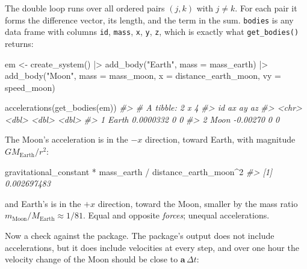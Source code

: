 \documentclass[
  10.5pt,
  letterpaper,
]{scrbook}
\newenvironment{Shaded}{\begin{snugshade}}{\end{snugshade}}
\newcommand{\AttributeTok}[1]{\textcolor[rgb]{0.00,0.00,0.00}{#1}}
\newcommand{\CommentTok}[1]{\textcolor[rgb]{0.00,0.00,0.00}{\textit{#1}}}
\newcommand{\DecValTok}[1]{\textcolor[rgb]{0.00,0.00,0.00}{#1}}
\newcommand{\FunctionTok}[1]{\textcolor[rgb]{0.00,0.00,0.00}{#1}}
\newcommand{\NormalTok}[1]{\textcolor[rgb]{0.00,0.00,0.00}{#1}}
\newcommand{\OtherTok}[1]{\textcolor[rgb]{0.00,0.00,0.00}{#1}}
\newcommand{\SpecialCharTok}[1]{\textcolor[rgb]{0.00,0.00,0.00}{#1}}
\newcommand{\StringTok}[1]{\textcolor[rgb]{0.00,0.00,0.00}{#1}}
\theoremstyle{plain}
\theoremstyle{remark}
\begin{document}
The double loop runs over all ordered pairs \((j, k)\) with
\(j \neq k\). For each pair it forms the difference vector, its length,
and the term in the sum. \texttt{bodies} is any data frame with columns
\texttt{id}, \texttt{mass}, \texttt{x}, \texttt{y}, \texttt{z}, which is
exactly what \texttt{get\_bodies()} returns:

\begin{Shaded}
\begin{Highlighting}[]
\NormalTok{em }\OtherTok{\textless{}{-}} \FunctionTok{create\_system}\NormalTok{() }\SpecialCharTok{|\textgreater{}}
  \FunctionTok{add\_body}\NormalTok{(}\StringTok{"Earth"}\NormalTok{, }\AttributeTok{mass =}\NormalTok{ mass\_earth) }\SpecialCharTok{|\textgreater{}}
  \FunctionTok{add\_body}\NormalTok{(}\StringTok{"Moon"}\NormalTok{,  }\AttributeTok{mass =}\NormalTok{ mass\_moon, }\AttributeTok{x =}\NormalTok{ distance\_earth\_moon, }\AttributeTok{vy =}\NormalTok{ speed\_moon)}

\FunctionTok{accelerations}\NormalTok{(}\FunctionTok{get\_bodies}\NormalTok{(em))}
\CommentTok{\#\textgreater{} \# A tibble: 2 x 4}
\CommentTok{\#\textgreater{}   id            ax    ay    az}
\CommentTok{\#\textgreater{}   \textless{}chr\textgreater{}      \textless{}dbl\textgreater{} \textless{}dbl\textgreater{} \textless{}dbl\textgreater{}}
\CommentTok{\#\textgreater{} 1 Earth  0.0000332     0     0}
\CommentTok{\#\textgreater{} 2 Moon  {-}0.00270       0     0}
\end{Highlighting}
\end{Shaded}

The Moon's acceleration is in the \(-x\) direction, toward Earth, with
magnitude \(G M_{\mathrm{Earth}}/r^2\):

\begin{Shaded}
\begin{Highlighting}[]
\NormalTok{gravitational\_constant }\SpecialCharTok{*}\NormalTok{ mass\_earth }\SpecialCharTok{/}\NormalTok{ distance\_earth\_moon}\SpecialCharTok{\^{}}\DecValTok{2}
\CommentTok{\#\textgreater{} [1] 0.002697483}
\end{Highlighting}
\end{Shaded}

and Earth's is in the \(+x\) direction, toward the Moon, smaller by the
mass ratio \(m_{\mathrm{Moon}}/M_{\mathrm{Earth}} \approx 1/81\). Equal
and opposite \emph{forces}; unequal accelerations.

Now a check against the package. The package's output does not include
accelerations, but it does include velocities at every step, and over
one hour the velocity change of the Moon should be close to
\(\mathbf{a}\,\Delta t\):
\end{document}
